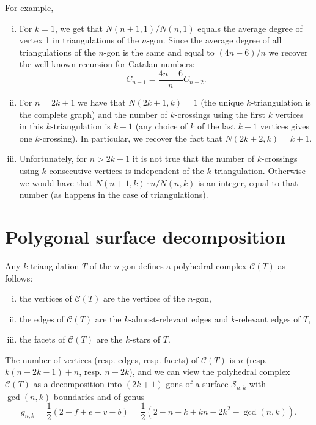 \documentclass[12pt]{amsart}
\begin{document}
\begin{remark}
For example,
\begin{enumerate}[(i)]
\item For $k=1$, we get that $N(n+1,1)/N(n,1)$ equals the average degree of vertex 1 in triangulations of the $n$-gon. Since the average degree of all triangulations of the $n$-gon is the same and equal to $(4n-6)/n$ we recover the well-known recursion for Catalan numbers:
\[
C_{n-1}=\frac{4n-6}{n}C_{n-2}.
\]

\item For $n=2k+1$ we have that $N(2k+1,k)=1$ (the unique $k$-triangulation is the complete graph)
and the number of $k$-crossings using the first $k$ vertices in this $k$-triangulation is $k+1$ (any choice of $k$ of the last $k+1$ vertices gives one $k$-crossing). In particular, we recover the fact that $N(2k+2,k)=k+1$.

\item Unfortunately, for $n>2k+1$ it is not true that the number of $k$-crossings using $k$ consecutive vertices is independent of the $k$-triangulation. Otherwise we would have that  $N(n+1,k)\cdot n /N(n,k)$ is an integer, equal to that number (as happens in the case of triangulations).
\end{enumerate}
\end{remark}



\section{Polygonal surface decomposition}

Any $k$-triangulation $T$ of the $n$-gon defines a polyhedral complex $\mathcal{C}(T)$ as follows:
\begin{enumerate}[(i)]
\item the vertices of $\mathcal{C}(T)$ are the vertices of the $n$-gon,
\item the edges of $\mathcal{C}(T)$ are the $k$-almost-relevant edges and $k$-relevant edges of $T$,
\item the facets of $\mathcal{C}(T)$ are the $k$-stars of $T$.
\end{enumerate}
The number of vertices (resp. edges, resp. facets) of $\mathcal{C}(T)$ is $n$ (resp. $k(n-2k-1)+n$, resp. $n-2k$), and we can view the polyhedral complex $\mathcal{C}(T)$ as a decomposition into $(2k+1)$-gons of a surface $\mathcal{S}_{n,k}$ with $\gcd(n,k)$ boundaries and of genus
$$g_{n,k}=\frac{1}{2}(2-f+e-v-b)=\frac{1}{2}(2-n+k+kn-2k^2-\gcd(n,k)).$$
\end{document}
